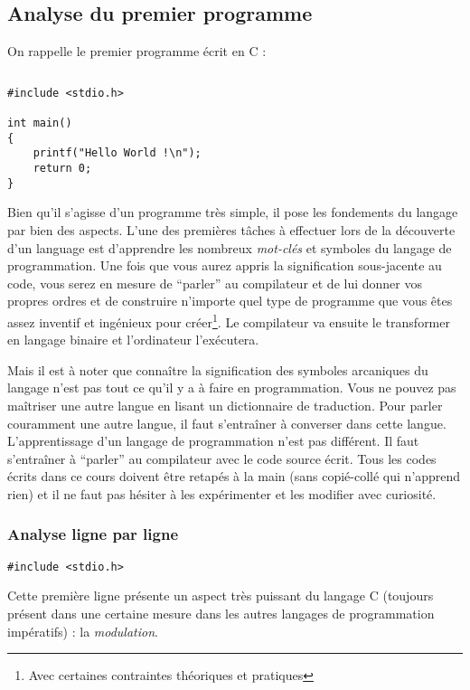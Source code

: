 \documentclass[../../main.tex]{subfiles}
\begin{document}
\subsection{Analyse du premier programme}
On rappelle le premier programme écrit en C :
\begin{lstlisting}[title=Un premier programme]
\end{lstlisting}
\begin{verbatim}
#include <stdio.h>

int main()
{
	printf("Hello World !\n");
	return 0;
}
\end{verbatim}
Bien qu'il s'agisse d'un programme très simple, il pose les fondements du langage par bien des aspects. L'une des premières tâches à effectuer lors de la découverte d'un language est d'apprendre les nombreux \textit{mot-clés} et symboles du langage de programmation. Une fois que vous aurez appris la signification sous-jacente au code, vous serez en mesure de ``parler'' au compilateur et de lui donner vos propres ordres et de construire n'importe quel type de programme que vous êtes assez inventif et ingénieux pour créer\footnote{Avec certaines contraintes théoriques et pratiques}. Le compilateur va ensuite le transformer en langage binaire et l'ordinateur l'exécutera.

Mais il est à noter que connaître la signification des symboles arcaniques du langage n'est pas tout ce qu'il y a à faire en programmation. Vous ne pouvez pas maîtriser une autre langue en lisant un dictionnaire de traduction. Pour parler couramment une autre langue, il faut s'entraîner à converser dans cette langue. L'apprentissage d'un langage de programmation n'est pas différent. Il faut s'entraîner à ``parler'' au compilateur avec le code source écrit. Tous les codes écrits dans ce cours doivent être retapés à la main (sans copié-collé qui n'apprend rien) et il ne faut pas hésiter à les expérimenter et les modifier avec curiosité.

\subsubsection{Analyse ligne par ligne}
\begin{verbatim}
#include <stdio.h>
\end{verbatim}
Cette première ligne présente un aspect très puissant du langage C (toujours présent dans une certaine mesure dans les autres langages de programmation impératifs) : la \textit{modulation}.
\end{document}

